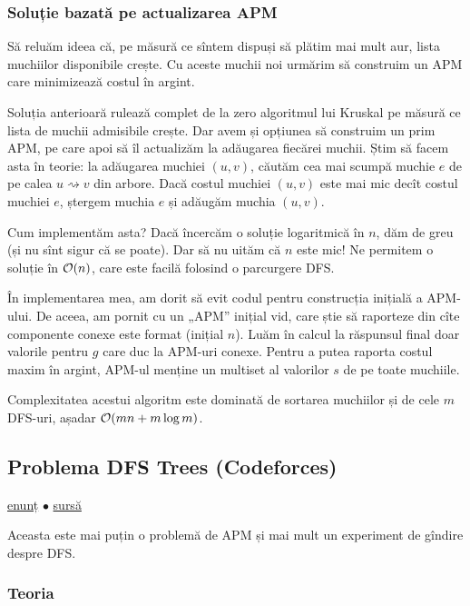 \documentclass[../main.tex]{subfiles}
\begin{document}
\subsubsection*{Soluție bazată pe actualizarea APM}

Să reluăm ideea că, pe măsură ce sîntem dispuși să plătim mai mult aur, lista muchiilor disponibile crește. Cu aceste muchii noi urmărim să construim un APM care minimizează costul în argint.

Soluția anterioară rulează complet de la zero algoritmul lui Kruskal pe măsură ce lista de muchii admisibile crește. Dar avem și opțiunea să construim un prim APM, pe care apoi să îl actualizăm la adăugarea fiecărei muchii. Știm să facem asta în teorie: la adăugarea muchiei $(u,v)$, căutăm cea mai scumpă muchie $e$ de pe calea $u \rightsquigarrow v$ din arbore. Dacă costul muchiei $(u,v)$ este mai mic decît costul muchiei $e$, ștergem muchia $e$ și adăugăm muchia $(u,v)$.

Cum implementăm asta? Dacă încercăm o soluție logaritmică în $n$, dăm de greu (și nu sînt sigur că se poate). Dar să nu uităm că $n$ este mic! Ne permitem o soluție în $\mathcal{O}(n)$, care este facilă folosind o parcurgere DFS.

În implementarea mea, am dorit să evit codul pentru construcția inițială a APM-ului. De aceea, am pornit cu un „APM” inițial vid, care știe să raporteze din cîte componente conexe este format (inițial $n$). Luăm în calcul la răspunsul final doar valorile pentru $g$ care duc la APM-uri conexe. Pentru a putea raporta costul maxim în argint, APM-ul menține un multiset al valorilor $s$ de pe toate muchiile.

Complexitatea acestui algoritm este dominată de sortarea muchiilor și de cele $m$ DFS-uri, așadar $\mathcal{O}(mn + m \log m)$.


\subsection{Problema DFS Trees (Codeforces)}
\label{problem:dfs-trees}

\href{https://codeforces.com/contest/1707/problem/C}{enunț}
$\bullet$
\hyperref[code:dfs-trees]{sursă}

Aceasta este mai puțin o problemă de APM și mai mult un experiment de gîndire despre DFS.

\subsubsection*{Teoria}
\end{document}

